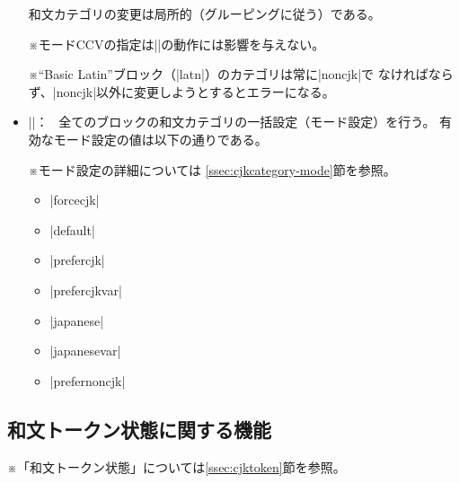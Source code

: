 \documentclass[uplatex,dvipdfmx,a4paper]{jsarticle}
\newcommand{\Meta}[1]{%
  $\langle$\mbox{}\nolinebreak#1\nolinebreak\mbox{}$\rangle$}
\newcommand{\Note}{\par\noindent ※}
\newcommand{\Means}{：~}
\begin{document}
\begin{itemize}
  和文カテゴリの変更は局所的（グルーピングに従う）である。

  \Note モードCCVの指定は|\cjkcategory|の動作には影響を与えない。

  \Note “Basic Latin”ブロック（|latn|）のカテゴリは常に|noncjk|で
    なければならず、|noncjk|以外に変更しようとするとエラーになる。

\item |\cjkcategorymode{|\Meta{モード}|}|\Means
  全てのブロックの和文カテゴリの一括設定（モード設定）を行う。
  有効なモード設定の値は以下の通りである。
  \Note モード設定の詳細については
  \ref{ssec:cjkcategory-mode}節を参照。
  \begin{itemize}
  \item |forcecjk|
  \item |default|
  \item |prefercjk|
  \item |prefercjkvar|
  \item |japanese|
  \item |japanesevar|
  \item |prefernoncjk|
  \end{itemize}

\end{itemize}

\subsection{和文トークン状態に関する機能}
\label{ssec:cjktoken-function}

\Note 「和文トークン状態」については\ref{ssec:cjktoken}節を参照。
\end{document}
